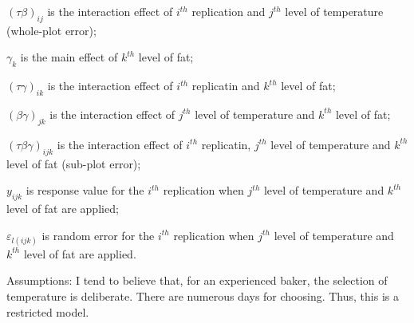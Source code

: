 \documentclass[12pt,]{article}
\begin{document}
\((\tau\beta)_{ij}\) is the interaction effect of \(i^{th}\) replication
and \(j^{th}\) level of temperature (whole-plot error);

\(\gamma_{k}\) is the main effect of \(k^{th}\) level of fat;

\((\tau\gamma)_{ik}\) is the interaction effect of \(i^{th}\) replicatin
and \(k^{th}\) level of fat;

\((\beta\gamma)_{jk}\) is the interaction effect of \(j^{th}\) level of
temperature and \(k^{th}\) level of fat;

\((\tau\beta\gamma)_{ijk}\) is the interaction effect of \(i^{th}\)
replicatin, \(j^{th}\) level of temperature and \(k^{th}\) level of fat
(sub-plot error);

\(y_{ijk}\) is response value for the \(i^{th}\) replication when
\(j^{th}\) level of temperature and \(k^{th}\) level of fat are applied;

\(\varepsilon_{l(ijk)}\) is random error for the \(i^{th}\) replication
when \(j^{th}\) level of temperature and \(k^{th}\) level of fat are
applied.

Assumptions: I tend to believe that, for an experienced baker, the
selection of temperature is deliberate. There are numerous days for
choosing. Thus, this is a restricted model.
\end{document}
